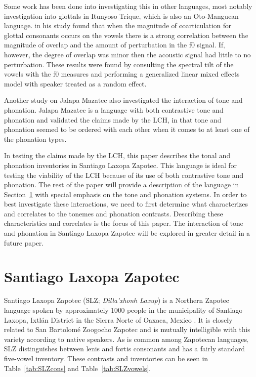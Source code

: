 \documentclass[12pt, letterpaper]{article}
\begin{document}
Some work has been done into investigating this in other languages, most notably  investigation into glottals in Itunyoso Trique, which is also an Oto-Manguean language. \citeauthor{dicanioCoarticulationToneGlottal2012} in his study found that when the magnitude of coarticulation for glottal consonants occurs on the vowels there is a strong correlation between the magnitude of overlap and the amount of perturbation in the f0 signal. If, however, the degree of overlap was minor then the acoustic signal had little to no perturbation. These results were found by consulting the spectral tilt of the vowels with the f0 measures and performing a generalized linear mixed effects model with speaker treated as a random effect. 

Another study on Jalapa Mazatec \citep{garellekAcousticConsequencesPhonation2011} also investigated the interaction of tone and phonation. Jalapa Mazatec is a language with both contrastive tone and phonation and \citet{garellekAcousticConsequencesPhonation2011} validated the claims made by the LCH, in that tone and phonation seemed to be ordered with each other when it comes to at least one of the phonation types.

In testing the claims made by the LCH, this paper describes the tonal and phonation inventories in Santiago Laxopa Zapotec. This language is ideal for testing the viability of the LCH because of its use of both contrastive tone and phonation. The rest of the paper will provide a description of the language in Section~\ref{sec:SLZ} with special emphasis on the tone and phonation systems. In order to best investigate these interactions, we need to first determine what characterizes and correlates to the tonemes and phonation contrasts. Describing these characteristics and correlates is the focus of this paper. The interaction of tone and phonation in Santiago Laxopa Zapotec will be explored in greater detail in a future paper.  
 
\section{Santiago Laxopa Zapotec} \label{sec:SLZ}

Santiago Laxopa Zapotec (SLZ; \textit{Dilla'xhonh Laxup}) is a Northern Zapotec language spoken by approximately 1000 people in the municipality of Santiago Laxopa, Ixtlán District in the Sierra Norte of Oaxaca, Mexico \citep{adlerAcousticsPhonationTypes2016,adlerDerivationVerbInitiality2018,foleyForbiddenCliticClusters2018,foleyExtendingPersonCaseConstraint2020}. It is closely related to San Bartolomé Zoogocho Zapotec \citep{longDiccionarioZapotecoSan2005,sonnenscheinDescriptiveGrammarSan2005} and is mutually intelligible with this variety according to native speakers.  As is common among Zapotecan languages, SLZ distinguishes between lenis and fortis consonants \citep[e.g.,][]{nellisFortisLenisCajonos1980,jaegerFortisLenisQuestion1983,uchiharaFortisLenisGlides2016} and has a fairly standard five-vowel inventory. These contrasts and inventories can be seen in Table~\ref{tab:SLZcons} and Table~\ref{tab:SLZvowels}.
\end{document}
